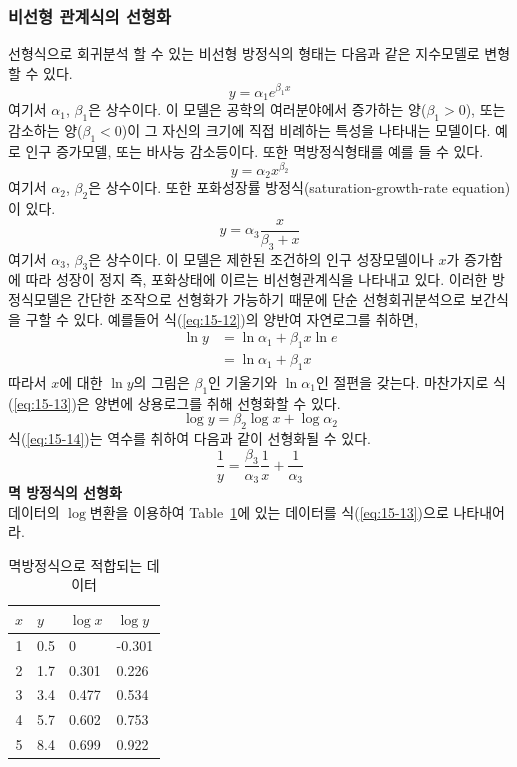 \subsubsection{비선형 관계식의 선형화}
선형식으로 회귀분석 할 수 있는 비선형 방정식의 형태는 다음과 같은 지수모델로 변형할 수 있다.
\begin{equation}\label{eq:15-12}
y=\alpha_{1}e^{\beta_{1}x}
\end{equation}
여기서 $\alpha_{1}$, $\beta_{1}$은 상수이다. 이 모델은 공학의 여러분야에서 증가하는 양($\beta_{1}>0$), 또는 감소하는 양($\beta_{1}<0$)이 그 자신의 크기에 직접 비례하는 특성을 나타내는 모델이다. 예로 인구 증가모델, 또는 바사능 감소등이다. 또한 멱방정식형태를 예를 들 수 있다.
\begin{equation}\label{eq:15-13}
y=\alpha_{2}x^{\beta_{2}}
\end{equation}
여기서 $\alpha_{2}$, $\beta_{2}$은 상수이다. 또한 포화성장률 방정식(saturation-growth-rate equation)이 있다.
\begin{equation}\label{eq:15-14}
y=\alpha_{3}\frac{x}{\beta_{3}+x}
\end{equation}
여기서 $\alpha_{3}$, $\beta_{3}$은 상수이다. 이 모델은 제한된 조건하의 인구 성장모델이나 $x$가 증가함에 따라 성장이 정지 즉, 포화상태에 이르는 비선형관계식을 나타내고 있다. 이러한 방정식모델은 간단한 조작으로 선형화가 가능하기 때문에 단순 선형회귀분석으로 보간식을 구할 수 있다. 예를들어 식(\ref{eq:15-12})의 양반여 자연로그를 취하면,
\begin{align}
\ln y&=\ln\alpha_{1}+\beta_{1}x\ln e\nonumber\\
&=\ln\alpha_{1}+\beta_{1}x\label{eq:15-15}
\end{align}
따라서 $x$에 대한 $\ln y$의 그림은 $\beta_{1}$인 기울기와 $\ln \alpha_{1}$인 절편을 갖는다. 마찬가지로 식(\ref{eq:15-13})은 양변에 상용로그를 취해 선형화할 수 있다.
\begin{equation}\label{eq:15-16}
\log y=\beta_{2}\log x+\log \alpha_{2}
\end{equation}
식(\ref{eq:15-14})는 역수를 취하여 다음과 같이 선형화될 수 있다.
\begin{equation}\label{eq:15-17}
\frac{1}{y}=\frac{\beta_{3}}{\alpha_{3}}\frac{1}{x}+\frac{1}{\alpha_{3}}
\end{equation}
 \textbf{멱 방정식의 선형화}\\
데이터의 $\log$변환을 이용하여 Table~\ref{tab:15-3}에 있는 데이터를 식(\ref{eq:15-13})으로 나타내어라.

\begin{table}[!hbt]
\centering
\begin{tabular}{c|l|l|l}
\hline\hline
$x$&$y$&$\log x$&$\log y$\\
\hline
1&0.5&0&-0.301\\
2&1.7&0.301&0.226\\
3&3.4&0.477&0.534\\
4&5.7&0.602&0.753\\
5&8.4&0.699&0.922\\
\hline\hline
\end{tabular}
\caption{멱방정식으로 적합되는 데이터}
\label{tab:15-3}
\end{table}

